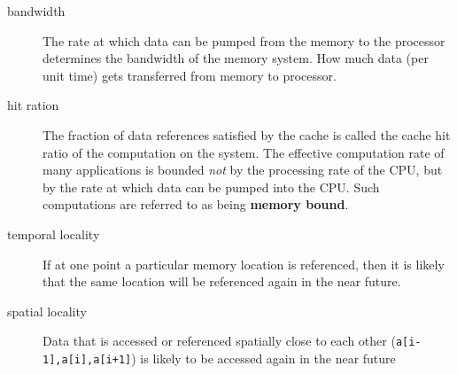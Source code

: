 \begin{description}
\item[bandwidth] The rate at which data can be pumped from the memory to the processor determines the bandwidth of the memory system.  How much data (per unit time) gets transferred from memory to processor.


\item[hit ration] The fraction of data references satisfied by the cache is called the cache hit ratio of the computation on the system.   The effective computation rate of many applications is bounded \emph{not} by the processing rate of the CPU, but by the rate at which data can be pumped into the CPU.  Such computations are referred to as being \textbf{memory bound}.


\item[temporal locality] If at one point a particular memory location is referenced, then it is likely that the same location will be referenced again in the near future.

\item[spatial locality] Data that is accessed or referenced spatially close to each other (\texttt{a[i-1],a[i],a[i+1]}) is likely to be accessed again in the near future
\end{description}
